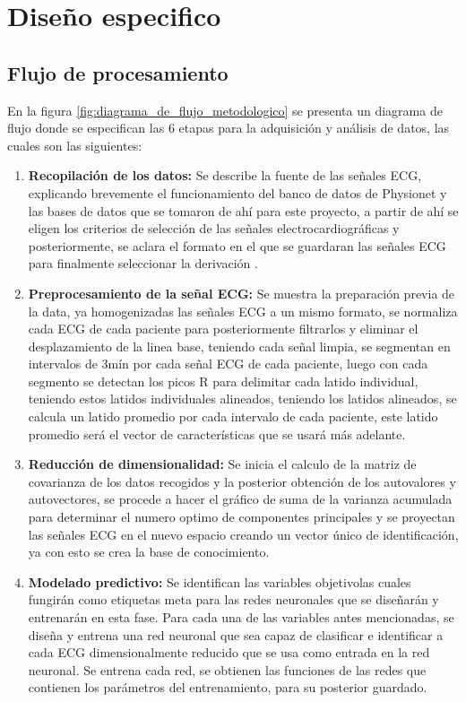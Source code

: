 \documentclass[12pt,letterpaper,oneside,openright]{book}
\begin{document}
\section{Diseño especifico}
\subsection{Flujo de procesamiento}

En la figura \ref{fig:diagrama_de_flujo_metodologico} se presenta un diagrama de flujo donde se especifican las 6 etapas para la adquisición y análisis de datos, las cuales son las siguientes:
\begin{enumerate}[label=\textbf{\Roman*.}]
	\item \textbf{Recopilación de los datos:} Se describe la fuente de las señales ECG, explicando brevemente el funcionamiento del banco de datos de Physionet y las bases de datos que se tomaron de ahí para este proyecto, a partir de ahí se eligen los criterios de selección de las señales electrocardiográficas y posteriormente, se aclara el formato en el que se guardaran las señales ECG para finalmente seleccionar la derivación .
	\item \textbf{Preprocesamiento de la señal ECG:} Se muestra la preparación previa de la data, ya homogenizadas las señales ECG a un mismo formato, se normaliza cada ECG de cada paciente para posteriormente filtrarlos y eliminar el desplazamiento de la linea base, teniendo cada señal limpia, se segmentan en intervalos de 3mín por cada señal ECG de cada paciente, luego con cada segmento se detectan los picos R para delimitar cada latido individual, teniendo estos latidos individuales alineados, teniendo los latidos alineados, se calcula un latido promedio por cada intervalo de cada paciente, este latido promedio será el vector de características que se usará más adelante.
	\item \textbf{Reducción de dimensionalidad:} Se inicia el calculo de la matriz de covarianza de los datos recogidos y la posterior obtención de los autovalores y autovectores, se procede a hacer el gráfico de suma de la varianza acumulada para determinar el numero optimo de componentes principales y se proyectan las señales ECG en el nuevo espacio creando un vector único de identificación, ya con esto se crea la base de conocimiento.
	\item \textbf{Modelado predictivo:} Se identifican las \guillemetleft variables objetivo\guillemetright las cuales fungirán como etiquetas \guillemetleft meta \guillemetright para las redes neuronales que se diseñarán y entrenarán en esta fase. Para cada una de las variables antes mencionadas, se diseña y entrena una red neuronal que sea capaz de clasificar e identificar a cada ECG dimensionalmente reducido que se usa como entrada en la red neuronal. Se entrena cada red, se obtienen las funciones de las redes que contienen los parámetros del entrenamiento, para su posterior guardado.

\end{enumerate}
\end{document}
